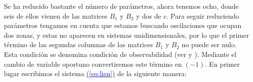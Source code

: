 \documentclass[12pt,a4paper]{report} %
\newcommand{\eref}[1]{\hyperref[#1]{\textcolor{blue}{(\ref*{#1})}}}
\newcommand{\eref}[1]{\hyperref[#1]{\textcolor{blue}{\textit{(\ref*{#1})}}}}
\begin{document}
\newpage

	\vspace{0.5cm}Se ha reducido bastante el número de parámetros, ahora tenemos ocho, donde seis de ellos vienen de las matrices $B_1$ y $B_2$ y dos de $c$. Para seguir reduciendo parámetros tengamos en cuenta que estamos buscando oscilaciones que ocupan dos zonas, y estas no aparecen en sistemas unidimensionales, por lo que el primer término de las segundas columnas de las matrices $B_1$ y $B_2$ no puede ser nulo. Esta condición se denomina condición de observabilidad (ver \cite{onsimplyfing} y \cite{docvic}). Mediante el cambio de variable oportuno convertiremos este término en $(-1)$. En primer lugar escribimos el sistema \eref{eq:lien} de la siguiente manera:
	
\end{document}
